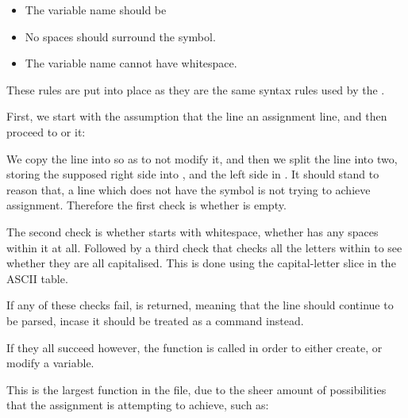 \documentclass[12pt, a4paper]{report}
\begin{document}
                \begin{itemize}
                    \item The variable name should be 
                    \item No spaces should surround the \tx{=} symbol.
                    \item The variable name cannot have whitespace.
                \end{itemize}

                These rules are put into place as they are the same
                syntax rules used by the .

                First, we start with the assumption that the line 
                an assignment line, and then proceed to  or
                 it:

                \begingroup
                    \fontsize{10pt}{10pt}\selectfont
                \endgroup

                We copy the line into  so as to not modify it, and then
                we split the line into two, storing the supposed right side into
                , and the left side in . It should stand to
                reason that, a line which does not have the \tx{=} symbol is not
                trying to achieve assignment. Therefore the first check is whether
                 is empty. 

                The second check is whether  starts with whitespace,
                 whether  has any spaces within it at all.
                Followed by a third check that checks all the letters within
                 to see whether they are all capitalised. This is done
                using the capital-letter slice in the ASCII table.

                If any of these checks fail,  is returned, meaning that
                the line should continue to be parsed, incase it should be treated
                as a command instead.

                If they all succeed however, the  function is called 
                in order to either create, or modify a variable.

                This is the largest function in the file, due to the
                sheer amount of possibilities that the assignment is
                attempting to achieve, such as:
                
\end{document}
